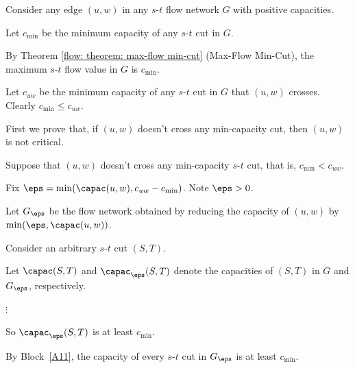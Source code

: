 \begin{longFormProof}

  \step Consider any edge $(u, w)$ in any $s$-$t$ flow network $G$ with positive capacities.

  \step Let $c_{\min}$ be the minimum capacity of any $s$-$t$ cut in $G$. 

  \step By Theorem \ref{flow: theorem: max-flow min-cut} (Max-Flow Min-Cut),  the maximum $s$-$t$ flow value in $G$ is $c_{\min}$. 

  \step Let $c_{uw}$ be the minimum capacity of any $s$-$t$ cut in $G$ that $(u,w)$ crosses.  Clearly $c_{\min} \le c_{uw}$.
  
  \smallskip \lineacross 

  \step First we prove that, if $(u,w)$ doesn't cross any min-capacity cut, then $(u, w)$ is not critical.
  
  \begin{block}\label{A1}

    \step
    Suppose that $(u, w)$ doesn't cross any min-capacity $s$-$t$ cut, that is, $c_{\min} < c_{uw}$.

    \step Fix $\eps = \min(\capac(u, w), c_{uw} - c_{\min})$.  Note $\eps> 0$.

    \step Let $G_\eps$ be the flow network obtained by reducing the capacity of $(u, w)$ by $\min(\eps, \capac(u,w))$.

    \begin{block}\label{A11}
      
      \step Consider an arbitrary $s$-$t$ cut $(S, T)$.

      \step Let $\capac(S, T)$ and $\capac_\eps(S, T)$ denote the capacities of $(S, T)$ in $G$ and $G_\eps$, respectively. 

      \begin{blue}
        
        \step \REPLACEME

        \step $\vdots$          %
        
      \end{blue}
    
      \step So $\capac_\eps(S, T)$ is at least $c_{\min}$.
      
    \end{block}

    \step By Block~\ref{A11}, the capacity of every $s$-$t$ cut in $G_\eps$ is at least $c_{\min}$.


\end{block}
\end{longFormProof}
